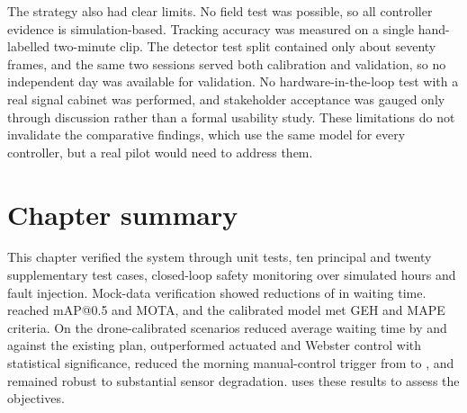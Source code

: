 The strategy also had clear limits. No field test was possible, so all controller evidence is simulation-based. Tracking accuracy was measured on a single hand-labelled two-minute clip. The detector test split contained only about seventy frames, and the same two sessions served both calibration and validation, so no independent day was available for validation. No hardware-in-the-loop test with a real signal cabinet was performed, and stakeholder acceptance was gauged only through discussion rather than a formal usability study. These limitations do not invalidate the comparative findings, which use the same model for every controller, but a real pilot would need to address them.

\section{Chapter summary}

This chapter verified the system through  unit tests, ten principal and twenty supplementary test cases, closed-loop safety monitoring over  simulated hours and fault injection. Mock-data verification showed reductions of  in waiting time. \dtx{} reached  mAP@0.5 and  MOTA, and the calibrated model met GEH and MAPE criteria. On the drone-calibrated scenarios \prism{} reduced average waiting time by  and  against the existing plan, outperformed actuated and Webster control with statistical significance, reduced the morning manual-control trigger from  to , and remained robust to substantial sensor degradation.  uses these results to assess the objectives.
